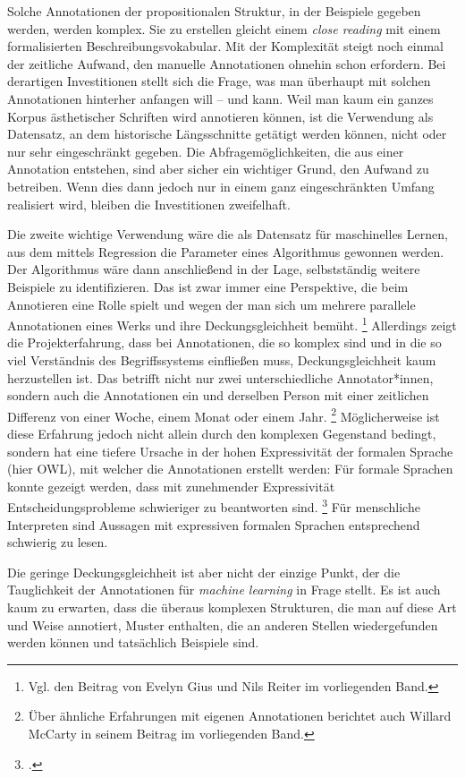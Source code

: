 \documentclass{article}
\newcommand*{\englisch}[1]{\foreignlanguage{english}{\textit{#1}}}%
\begin{document}
Solche Annotationen der propositionalen Struktur, in der Beispiele
gegeben werden, werden komplex. Sie zu erstellen gleicht einem
\englisch{close reading} mit einem formalisierten
Beschreibungsvokabular. Mit der Komplexität steigt noch einmal der
zeitliche Aufwand, den manuelle Annotationen ohnehin schon
erfordern. Bei derartigen Investitionen stellt sich die Frage, was man
überhaupt mit solchen Annotationen hinterher anfangen will -- und
kann. Weil man kaum ein ganzes Korpus ästhetischer Schriften wird
annotieren können, ist die Verwendung als Datensatz, an dem
historische Längsschnitte getätigt werden können, nicht oder nur sehr
eingeschränkt gegeben. Die Abfragemöglichkeiten, die aus einer
Annotation entstehen, sind aber sicher ein wichtiger Grund, den
Aufwand zu betreiben. Wenn dies dann jedoch nur in einem ganz
eingeschränkten Umfang realisiert wird, bleiben die Investitionen
zweifelhaft.

Die zweite wichtige Verwendung wäre die als Datensatz für maschinelles
Lernen, aus dem mittels Regression die Parameter eines Algorithmus
gewonnen werden. Der Algorithmus wäre dann anschließend in der Lage,
selbstständig weitere Beispiele zu identifizieren. Das ist zwar immer
eine Perspektive, die beim Annotieren eine Rolle spielt und wegen der
man sich um mehrere parallele Annotationen eines Werks und ihre
Deckungsgleichheit bemüht.%
\footnote{Vgl. den Beitrag von Evelyn Gius und Nils Reiter im
  vorliegenden Band.} %
Allerdings zeigt die Projekterfahrung, dass bei Annotationen, die so
komplex sind und in die so viel Verständnis des Begriffssystems
einfließen muss, Deckungsgleichheit kaum herzustellen ist. Das
betrifft nicht nur zwei unterschiedliche Annotator*innen, sondern auch
die Annotationen ein und derselben Person mit einer zeitlichen
Differenz von einer Woche, einem Monat oder einem Jahr.%
\footnote{Über ähnliche Erfahrungen mit eigenen Annotationen berichtet
  auch Willard McCarty in seinem Beitrag im vorliegenden Band.} %
Möglicherweise ist diese Erfahrung jedoch nicht allein durch den
komplexen Gegenstand bedingt, sondern hat eine tiefere Ursache in der
hohen Expressivität der formalen Sprache (hier OWL), mit welcher die
Annotationen erstellt werden: Für formale Sprachen konnte gezeigt
werden, dass mit zunehmender Expressivität Entscheidungsprobleme
schwieriger zu beantworten sind.%
\footcite[bes. \pno\,299\psqq]{Okhotin2005a} %
Für menschliche Interpreten sind Aussagen mit expressiven formalen
Sprachen entsprechend schwierig zu lesen.

Die geringe Deckungsgleichheit ist aber nicht der einzige Punkt, der
die Tauglichkeit der Annotationen für \englisch{machine learning} in
Frage stellt. Es ist auch kaum zu erwarten, dass die überaus komplexen
Strukturen, die man auf diese Art und Weise annotiert, Muster
enthalten, die an anderen Stellen wiedergefunden werden können und
tatsächlich Beispiele sind.
\end{document}
